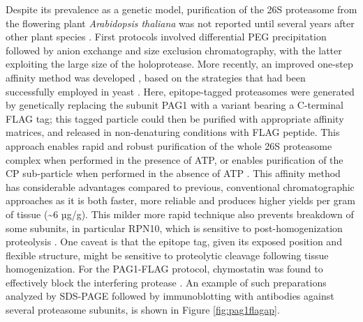 Despite its prevalence as a genetic model, purification of the 26S proteasome from the flowering plant \textit{Arabidopsis thaliana} was not reported until several years after other plant species \citep{yang04}.  First protocols involved differential PEG precipitation followed by anion exchange and size exclusion chromatography, with the latter exploiting the large size of the holoprotease.  More recently, an improved one-step affinity method was developed \citep{book10}, based on the strategies that had been successfully employed in yeast \citep{leggett05}.  Here, epitope-tagged proteasomes were generated by genetically replacing the subunit PAG1 with a variant bearing a C-terminal FLAG tag; this tagged particle could then be purified with appropriate affinity matrices, and released in non-denaturing conditions with FLAG peptide.  This approach enables rapid and robust purification of the whole 26S proteasome complex when performed in the presence of ATP, or enables purification of the CP sub-particle when performed in the absence of ATP \citep{book10}. This affinity method has considerable advantages compared to previous, conventional chromatographic approaches \citep{yang04} as it is both faster, more reliable and produces higher yields per gram of tissue (\textasciitilde{}6 µg/g). This milder more rapid technique also prevents breakdown of some subunits, in particular RPN10, which is sensitive to post-homogenization proteolysis \citep{yang04}.  One caveat is that the epitope tag, given its exposed position and flexible structure, might be sensitive to proteolytic cleavage following tissue homogenization.  For the PAG1-FLAG protocol, chymostatin was found to effectively block the interfering protease \citep{book10}. An example of such preparations analyzed by SDS-PAGE followed by immunoblotting with antibodies against several proteasome subunits, is shown in Figure \ref{fig:pag1flagap}.

